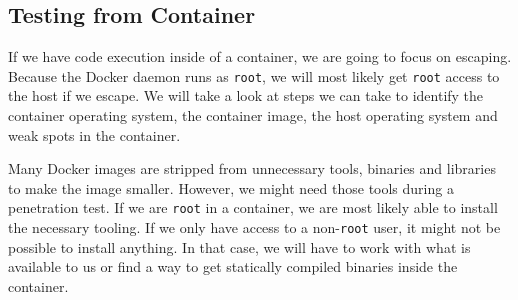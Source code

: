 \subsection{Testing from Container}
If we have code execution inside of a container, we are going to focus on escaping. Because the Docker daemon runs as \lstinline{root}, we will most likely get \lstinline{root} access to the host if we escape. We will take a look at steps we can take to identify the container operating system, the container image, the host operating system and weak spots in the container.

\hfill

Many Docker images are stripped from unnecessary tools, binaries and libraries to make the image smaller. However, we might need those tools during a penetration test. If we are \lstinline{root} in a container, we are most likely able to install the necessary tooling. If we only have access to a non-\lstinline{root} user, it might not be possible to install anything. In that case, we will have to work with what is available to us or find a way to get statically compiled binaries inside the container.








